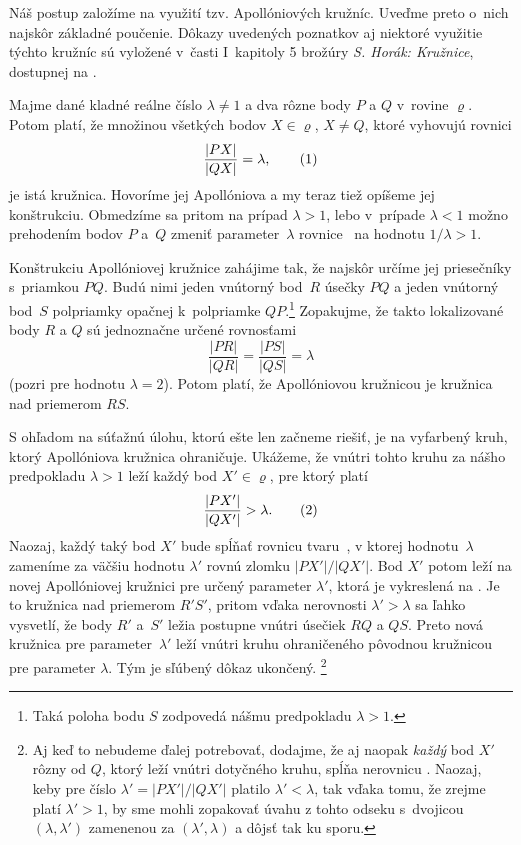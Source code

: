 {%
\let\la=\lambda
\let\ro=\varrho
\def\ve#1{\overrightarrow{#1}}
Náš postup založíme na využití tzv. Apollóniových kružníc. Uveďme
preto o~nich najskôr základné poučenie. Dôkazy uvedených
poznatkov aj niektoré využitie týchto kružníc sú vyložené v~časti
I~kapitoly 5 brožúry {\it S. Horák: Kružnice}, dostupnej na
.

Majme dané kladné reálne číslo $\la\ne1$ a dva rôzne body $P$ a
$Q$ v~rovine $\ro$. Potom platí, že množinou všetkých bodov $X\in\ro$,
$X\ne Q$, ktoré vyhovujú rovnici
$$
\frac{|PX|}{|QX|}=\la,
\tag1
$$
je istá kružnica. Hovoríme jej Apollóniova a my teraz
tiež opíšeme jej konštrukciu. Obmedzíme sa pritom na prípad $\la>1$, lebo
v~prípade $\la<1$ možno prehodením bodov $P$ a~$Q$ zmeniť
parameter~$\la$ rovnice~ na hodnotu $1/\la>1$.

Konštrukciu Apollóniovej kružnice  zahájime tak, že najskôr
určíme jej priesečníky s~priamkou $PQ$. Budú nimi jeden vnútorný
bod~$R$ úsečky $PQ$ a
jeden vnútorný bod~$S$ polpriamky opačnej k~polpriamke
$QP$.\footnote{Taká poloha bodu $S$ zodpovedá nášmu predpokladu
$\la>1$.} Zopakujme, že takto lokalizované body $R$ a $Q$
sú jednoznačne určené rovnosťami
$$
\frac{|PR|}{|QR|}=\frac{|PS|}{|QS|}=\la
$$
(pozri \obr{} pre hodnotu $\la=2$).
%
Potom platí, že Apollóniovou kružnicou  je kružnica nad priemerom $RS$.

S ohľadom na súťažnú úlohu, ktorú ešte len začneme riešiť,
je na  vyfarbený kruh, ktorý Apollóniova
kružnica  ohraničuje. Ukážeme, že vnútri tohto kruhu
za nášho predpokladu $\la>1$ leží každý bod $X'\in\ro$,
pre ktorý platí
$$
\frac{|PX'|}{|QX'|}>\la.
\tag2
$$
Naozaj, každý taký bod $X'$ bude spĺňať rovnicu tvaru~,
v ktorej hodnotu~$\la$ zameníme za väčšiu hodnotu $\la'$ rovnú zlomku
${|PX'|}/{|QX'|}$. Bod $X'$ potom leží na novej Apollóniovej kružnici
pre určený parameter $\la'$, ktorá je vykreslená na .
Je to kružnica nad priemerom $R'S'$, pritom vďaka nerovnosti
$\la'>\la$ sa ľahko vysvetlí, že body $R'$ a~$S'$ ležia postupne
vnútri úsečiek $RQ$ a $QS$. Preto nová kružnica pre parameter~$\la'$
leží vnútri kruhu ohraničeného pôvodnou kružnicou pre parameter
$\la$. Tým je sľúbený dôkaz ukončený.%
\footnote{Aj keď to nebudeme
ďalej potrebovať, dodajme, že aj naopak
{\it každý\/} bod $X'$ rôzny od $Q$, ktorý leží vnútri
dotyčného kruhu, spĺňa nerovnicu . Naozaj, keby pre číslo
$\la'=|PX'|/|QX'|$ platilo $\la'<\la$, tak vďaka tomu, že zrejme
platí $\la'>1$,
by sme mohli zopakovať úvahu z tohto odseku s~dvojicou $(\la,\la')$
zamenenou za $(\la',\la)$ a dôjsť tak ku sporu.}

}
